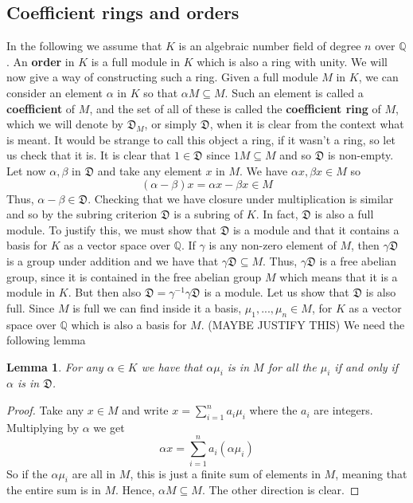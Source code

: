 \documentclass{article}
\newtheorem{lemma}{Lemma}[section]
\newcommand{\mfrak}[1]{\mathfrak{#1}}
\newcommand{\mbb}[1]{\mathbb{#1}}
\numberwithin{equation}{section}
\begin{document}
\subsection{Coefficient rings and orders}
In the following we assume that $K$ is an algebraic number field of degree $n$ over $\mbb Q$. An \textbf{order} in $K$ is a full module in $K$ which is also a ring with unity. We will now give a way of constructing such a ring. Given a full module $M$ in $K$, we can consider an element $\alpha$ in $K$ so that $\alpha M \subseteq M$. Such an element is called a \textbf{coefficient} of $M$, and the set of all of these is called the \textbf{coefficient ring} of $M$, which we will denote by $\mfrak D_M$, or simply $\mfrak D$, when it is clear from the context what is meant. It would be strange to call this object a ring, if it wasn't a ring, so let us check that it is. It is clear that $1 \in \mfrak{D}$ since $1 M \subseteq M$ and so $\mfrak{D}$ is non-empty. Let now $\alpha, \beta$ in $\mfrak D$ and take any element $x$ in $M$. We have $\alpha x, \beta x \in M$ so $$(\alpha - \beta)x = \alpha x - \beta x \in M$$
Thus, $\alpha - \beta \in \mfrak{D}$. Checking that we have closure under multiplication is similar and so by the subring criterion $\mfrak{D}$ is a subring of $K$. In fact, $\mfrak{D}$ is also a full module. To justify this, we must show that $\mfrak{D}$ is a module and that it contains a basis for $K$ as a vector space over $\mbb Q$. If $\gamma$ is any non-zero element of $M$, then $\gamma \mfrak{D}$ is a group under addition and we have that $\gamma \mfrak{D} \subseteq M$. Thus, $\gamma \mfrak D$ is a free abelian group, since it is contained in the free abelian group $M$ which means that it is a module in $K$. But then also $\mfrak{D} = \gamma^{-1} \gamma \mfrak{D}$ is a module. Let us show that $\mfrak D$ is also full. Since $M$ is full we can find inside it a basis, $\mu_1, ..., \mu_n \in M$, for $K$ as a vector space over $\mbb Q$ which is also a basis for $M$. (MAYBE JUSTIFY THIS) We need the following lemma

\begin{lemma}\label{lem:SufficientConditionForCoefficient}
    For any $\alpha \in K$ we have that $\alpha \mu_i$ is in $M$ for all the $\mu_i$ if and only if $\alpha$ is in $\mfrak D$.
\end{lemma}
\begin{proof}
    Take any $x \in M$ and write $x = \sum_{i=1}^n a_i \mu_i$ where the $a_i$ are integers. Multiplying by $\alpha$ we get
    $$\alpha x = \sum_{i=1}^n a_i (\alpha \mu_i)$$
    So if the $\alpha \mu_i$ are all in $M$, this is just a finite sum of elements in $M$, meaning that the entire sum is in $M$. Hence, $\alpha M \subseteq M$. The other direction is clear.
\end{proof}
\end{document}
